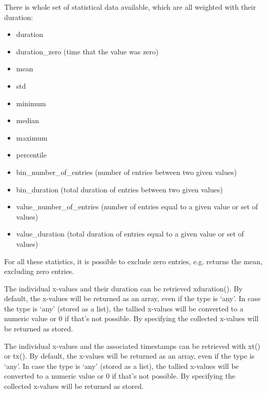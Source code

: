 \documentclass[letterpaper,10pt,english]{sphinxmanual}
\begin{document}
There is whole set of statistical data available, which are all weighted with their duration:
\begin{itemize}
\item {} 
duration

\item {} 
duration\_zero (time that the value was zero)

\item {} 
mean

\item {} 
std

\item {} 
minimum

\item {} 
median

\item {} 
maximum

\item {} 
percentile

\item {} 
bin\_number\_of\_entries (number of entries between two given values)

\item {} 
bin\_duration (total duration of entries between two given values)

\item {} 
value\_number\_of\_entries (number of entries equal to a given value or set of values)

\item {} 
value\_duration (total duration of entries equal to a given value or set of values)

\end{itemize}

For all these statistics, it is possible to exclude zero entries, e.g.  returns the mean, excluding zero entries.

The individual x-values and their duration can be retrieved xduration(). By default, the x-values will be returned as an array, even if
the type is ‘any’. In case the type is ‘any’ (stored as a list), the tallied x-values will be converted to a numeric value or 0 if
that’s not possible. By specifying  the collected x-values will be returned as stored.

The individual x-values and the associated timestamps can be retrieved with xt() or tx(). By default, the x-values will be returned as an array, even if
the type is ‘any’. In case the type is ‘any’ (stored as a list), the tallied x-values will be converted to a numeric value or 0 if
that’s not possible. By specifying  the collected x-values will be returned as stored.
\end{document}
